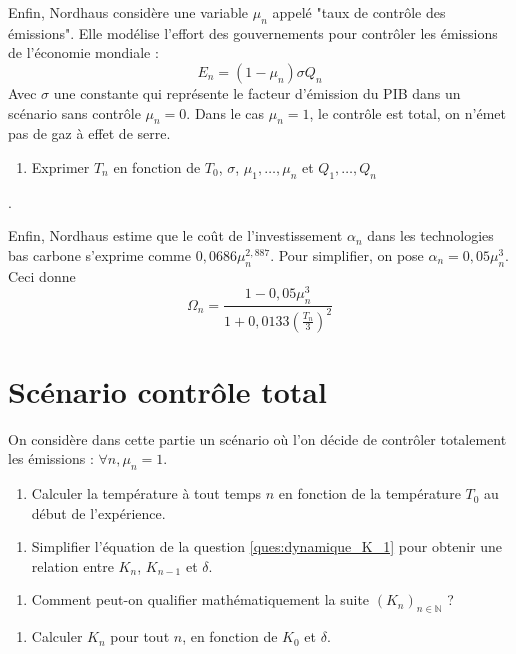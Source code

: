\documentclass[12pt,a4paper]{article}
\newcommand{\ques}[1]{\begin{enumerate}[resume]
\item  #1
\end{enumerate}}
\newcommand{\rep}[1]{\textit{Réponse :} #1 \\}
\renewcommand{\rep}[1]{ }
\theoremstyle{remark}
\def\NN{\mathbb{N}}
\begin{document}
{Enfin, Nordhaus considère une variable $\mu_n$ appelé "taux de contrôle des émissions".
Elle modélise l'effort des gouvernements pour contrôler les émissions de l'économie mondiale :
\begin{equation*}
E_n=(1-\mu_n)\sigma Q_n
\end{equation*}
Avec $\sigma$ une constante qui représente le facteur d'émission du PIB dans un scénario sans contrôle $\mu_n=0$. 
Dans le cas $\mu_n=1$, le contrôle est total, on n'émet pas de gaz à effet de serre.
\ques{Exprimer $T_n$ en fonction de $T_0$, $\sigma$, $\mu_1, \dots, \mu_n$ et $Q_1, \dots ,Q_n$}.
\rep{\begin{equation*}T_n= T_0+\frac{\sigma}{2000} \sum_{k=1}^n (1-\mu_k) Q_k  \end{equation*}}

Enfin, Nordhaus estime que le coût de l'investissement $\alpha_n$ dans les technologies bas carbone s'exprime comme $0,0686 \mu_n^{2,887}$. Pour simplifier, on pose $\alpha_n = 0,05\mu_n^3$. Ceci donne 
\begin{equation*}
\Omega_n = \frac{1-0,05\mu_n^3}{1+0,0133 (\frac{T_n}{3})^2}
\end{equation*}

\section*{\sc Scénario contrôle total}
On considère dans cette partie un scénario où l'on décide de contrôler totalement les émissions : $\forall n, \mu_n=1$.
\ques{Calculer la température à tout temps $n$ en fonction de la température $T_0$ au début de l'expérience. }
\rep{$\forall n, T_n =T_0 = 0,8$°C.}

\ques{Simplifier l'équation de la question \ref{ques:dynamique_K_1} pour obtenir une relation entre $K_n$, $K_{n-1}$ et $\delta$.\label{ques:dynamique_K_2} }
\rep{
\begin{equation*}
\forall n, \quad \Omega_n = \frac{1-0,05}{1+0,0133 (\frac{T_0}{3})}^2=\frac{0,95}{1,000945778}=0,9491
\end{equation*}
\begin{equation*}
\forall n, \quad  K_n = \frac{1- \delta}{1- 0,2373 A} K_{n-1}
\end{equation*}
}

\ques{Comment peut-on qualifier mathématiquement la suite $(K_n)_{n\in \NN}$ ? \label{ques:suite_geo}}
\rep{$(K_n)_{n\in \NN}$ est une suite géométrique de raison $\frac{1- \delta}{1- 0,2373}$.}

\ques{Calculer $K_n$ pour tout $n$, en fonction de $K_0$ et $\delta$.}
\rep{\begin{equation*}
\forall n, \quad  K_n = K_0 \left(\frac{1- \delta}{1- 0,2373}\right)^n 
\end{equation*}}

}
\end{document}

